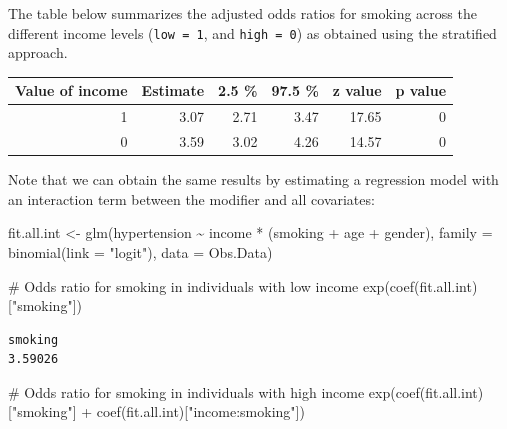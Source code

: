 \documentclass[
  letterpaper,
  DIV=11,
  numbers=noendperiod]{scrreprt}
\newenvironment{Shaded}{\begin{snugshade}}{\end{snugshade}}
\newcommand{\AttributeTok}[1]{\textcolor[rgb]{0.40,0.45,0.13}{#1}}
\newcommand{\CommentTok}[1]{\textcolor[rgb]{0.37,0.37,0.37}{#1}}
\newcommand{\FunctionTok}[1]{\textcolor[rgb]{0.28,0.35,0.67}{#1}}
\newcommand{\NormalTok}[1]{\textcolor[rgb]{0.00,0.23,0.31}{#1}}
\newcommand{\OtherTok}[1]{\textcolor[rgb]{0.00,0.23,0.31}{#1}}
\newcommand{\SpecialCharTok}[1]{\textcolor[rgb]{0.37,0.37,0.37}{#1}}
\newcommand{\StringTok}[1]{\textcolor[rgb]{0.13,0.47,0.30}{#1}}
\begin{document}
The table below summarizes the adjusted odds ratios for smoking across
the different income levels (\texttt{low\ =\ 1}, and
\texttt{high\ =\ 0}) as obtained using the stratified approach.

\begin{table}[!h]
\centering
\begin{tabular}{rrrrrr}
\toprule
Value of income & Estimate & 2.5 \% & 97.5 \% & z value & p value\\
\midrule
1 & 3.07 & 2.71 & 3.47 & 17.65 & 0\\
0 & 3.59 & 3.02 & 4.26 & 14.57 & 0\\
\bottomrule
\end{tabular}
\end{table}

Note that we can obtain the same results by estimating a regression
model with an interaction term between the modifier and all covariates:

\begin{Shaded}
\begin{Highlighting}[]
\NormalTok{fit.all.int }\OtherTok{\textless{}{-}} \FunctionTok{glm}\NormalTok{(hypertension }\SpecialCharTok{\textasciitilde{}}\NormalTok{ income }\SpecialCharTok{*}\NormalTok{ (smoking }\SpecialCharTok{+}\NormalTok{ age }\SpecialCharTok{+}\NormalTok{ gender), }
                   \AttributeTok{family =} \FunctionTok{binomial}\NormalTok{(}\AttributeTok{link =} \StringTok{"logit"}\NormalTok{), }\AttributeTok{data =}\NormalTok{ Obs.Data)}

\CommentTok{\# Odds ratio for smoking in individuals with low income }
\FunctionTok{exp}\NormalTok{(}\FunctionTok{coef}\NormalTok{(fit.all.int)[}\StringTok{"smoking"}\NormalTok{])}
\end{Highlighting}
\end{Shaded}

\begin{verbatim}
smoking 
3.59026 
\end{verbatim}

\begin{Shaded}
\begin{Highlighting}[]
\CommentTok{\# Odds ratio for smoking in individuals with high income}
\FunctionTok{exp}\NormalTok{(}\FunctionTok{coef}\NormalTok{(fit.all.int)[}\StringTok{"smoking"}\NormalTok{] }\SpecialCharTok{+} \FunctionTok{coef}\NormalTok{(fit.all.int)[}\StringTok{"income:smoking"}\NormalTok{])}
\end{Highlighting}
\end{Shaded}
\end{document}
